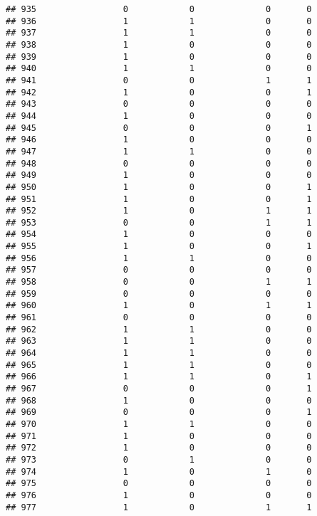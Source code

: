 \documentclass[]{article}
\begin{document}
\begin{verbatim}
## 935                 0            0              0       0
## 936                 1            1              0       0
## 937                 1            1              0       0
## 938                 1            0              0       0
## 939                 1            0              0       0
## 940                 1            1              0       0
## 941                 0            0              1       1
## 942                 1            0              0       1
## 943                 0            0              0       0
## 944                 1            0              0       0
## 945                 0            0              0       1
## 946                 1            0              0       0
## 947                 1            1              0       0
## 948                 0            0              0       0
## 949                 1            0              0       0
## 950                 1            0              0       1
## 951                 1            0              0       1
## 952                 1            0              1       1
## 953                 0            0              1       1
## 954                 1            0              0       0
## 955                 1            0              0       1
## 956                 1            1              0       0
## 957                 0            0              0       0
## 958                 0            0              1       1
## 959                 0            0              0       0
## 960                 1            0              1       1
## 961                 0            0              0       0
## 962                 1            1              0       0
## 963                 1            1              0       0
## 964                 1            1              0       0
## 965                 1            1              0       0
## 966                 1            1              0       1
## 967                 0            0              0       1
## 968                 1            0              0       0
## 969                 0            0              0       1
## 970                 1            1              0       0
## 971                 1            0              0       0
## 972                 1            0              0       0
## 973                 0            1              0       0
## 974                 1            0              1       0
## 975                 0            0              0       0
## 976                 1            0              0       0
## 977                 1            0              1       1

\end{verbatim}
\end{document}
